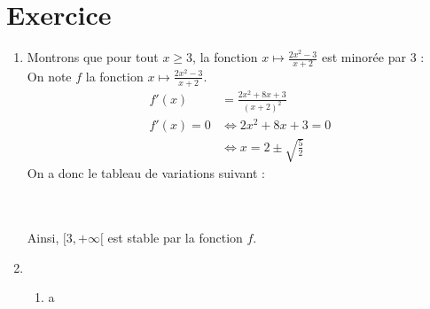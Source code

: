 \documentclass{report}
\begin{document}
\section{Exercice}
\begin{enumerate}
\item Montrons que pour tout $x \geq 3$, la fonction $x \mapsto \frac{2x^2 - 3}{x+2}$ est minorée par $3$ : \\
On note $f$ la fonction $x \mapsto \frac{2x^2 - 3}{x+2}$. \\
\begin{align*}
    f'(x) &= \frac{2x^2+8x+3}{(x+2)^2} \\
    f'(x) = 0 &\Leftrightarrow 2x^2 + 8x + 3 = 0 \\
    &\Leftrightarrow x = 2 \pm \sqrt{\frac{5}{2}}
\end{align*}
On a donc le tableau de variations suivant : \\ \\
 \\

\noindent Ainsi, $[3, +\infty[$ est stable par la fonction $f$. 

\item \begin{enumerate}
    \item a
\end{enumerate}
\end{enumerate}
\end{document}
